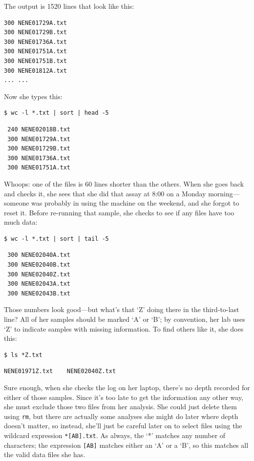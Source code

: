 \documentclass{book}
\begin{document}
The output is 1520 lines that look like this:

\begin{verbatim}
300 NENE01729A.txt
300 NENE01729B.txt
300 NENE01736A.txt
300 NENE01751A.txt
300 NENE01751B.txt
300 NENE01812A.txt
... ...
\end{verbatim}

Now she types this:

\begin{verbatim}
$ wc -l *.txt | sort | head -5
\end{verbatim}

\begin{verbatim}
 240 NENE02018B.txt
 300 NENE01729A.txt
 300 NENE01729B.txt
 300 NENE01736A.txt
 300 NENE01751A.txt
\end{verbatim}

Whoops: one of the files is 60 lines shorter than the others. When she
goes back and checks it, she sees that she did that assay at 8:00 on a
Monday morning---someone was probably in using the machine on the
weekend, and she forgot to reset it. Before re-running that sample, she
checks to see if any files have too much data:

\begin{verbatim}
$ wc -l *.txt | sort | tail -5
\end{verbatim}

\begin{verbatim}
 300 NENE02040A.txt
 300 NENE02040B.txt
 300 NENE02040Z.txt
 300 NENE02043A.txt
 300 NENE02043B.txt
\end{verbatim}

Those numbers look good---but what's that `Z' doing there in the
third-to-last line? All of her samples should be marked `A' or `B'; by
convention, her lab uses `Z' to indicate samples with missing
information. To find others like it, she does this:

\begin{verbatim}
$ ls *Z.txt
\end{verbatim}

\begin{verbatim}
NENE01971Z.txt    NENE02040Z.txt
\end{verbatim}

Sure enough, when she checks the log on her laptop, there's no depth
recorded for either of those samples. Since it's too late to get the
information any other way, she must exclude those two files from her
analysis. She could just delete them using \texttt{rm}, but there are
actually some analyses she might do later where depth doesn't matter, so
instead, she'll just be careful later on to select files using the
wildcard expression \texttt{*{[}AB{]}.txt}. As always, the `*' matches
any number of characters; the expression \texttt{{[}AB{]}} matches
either an `A' or a `B', so this matches all the valid data files she
has.
\end{document}
